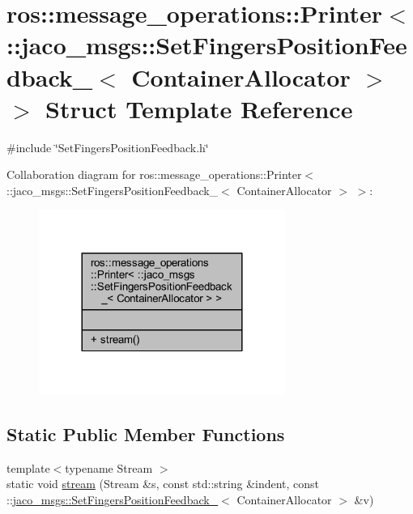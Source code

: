 \hypertarget{structros_1_1message__operations_1_1Printer_3_01_1_1jaco__msgs_1_1SetFingersPositionFeedback___3_01ContainerAllocator_01_4_01_4}{}\section{ros\+:\+:message\+\_\+operations\+:\+:Printer$<$ \+:\+:jaco\+\_\+msgs\+:\+:Set\+Fingers\+Position\+Feedback\+\_\+$<$ Container\+Allocator $>$ $>$ Struct Template Reference}
\label{structros_1_1message__operations_1_1Printer_3_01_1_1jaco__msgs_1_1SetFingersPositionFeedback___3_01ContainerAllocator_01_4_01_4}


{\ttfamily \#include \char`\"{}Set\+Fingers\+Position\+Feedback.\+h\char`\"{}}



Collaboration diagram for ros\+:\+:message\+\_\+operations\+:\+:Printer$<$ \+:\+:jaco\+\_\+msgs\+:\+:Set\+Fingers\+Position\+Feedback\+\_\+$<$ Container\+Allocator $>$ $>$\+:
\nopagebreak
\begin{figure}[H]
\begin{center}
\leavevmode
\includegraphics[width=228pt]{d4/de1/structros_1_1message__operations_1_1Printer_3_01_1_1jaco__msgs_1_1SetFingersPositionFeedback___33fc6590a1652ae1ece73f58c44c4a524}
\end{center}
\end{figure}
\subsection*{Static Public Member Functions}
\begin{DoxyCompactItemize}
\item 
{\footnotesize template$<$typename Stream $>$ }\\static void \hyperlink{structros_1_1message__operations_1_1Printer_3_01_1_1jaco__msgs_1_1SetFingersPositionFeedback___3_01ContainerAllocator_01_4_01_4_a02578137aa537ae0b96fff598c605093}{stream} (Stream \&s, const std\+::string \&indent, const \+::\hyperlink{structjaco__msgs_1_1SetFingersPositionFeedback__}{jaco\+\_\+msgs\+::\+Set\+Fingers\+Position\+Feedback\+\_\+}$<$ Container\+Allocator $>$ \&v)
\end{DoxyCompactItemize}


